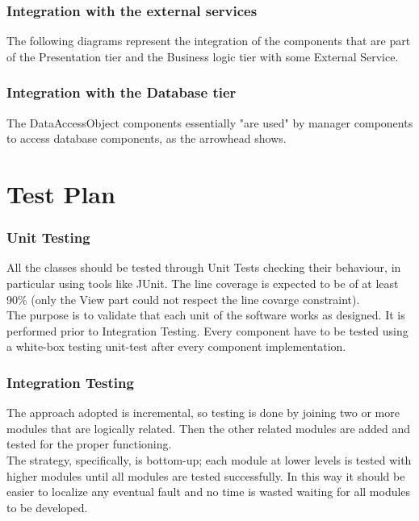 \documentclass[../DD.tex]{subfiles}
\begin{document}
\subsubsection{Integration with the external services}
The following diagrams represent the integration of the components that are part of the Presentation tier and the Business logic tier with some External Service.


\subsubsection{Integration with the Database tier}
The DataAccessObject components essentially "are used" by manager components to access database components, as the arrowhead shows.

\newpage

\section{Test Plan\label{5.4}}

\subsubsection{Unit Testing\label{5.4.1}}
All the classes should be tested through Unit Tests checking their behaviour, in particular using tools like JUnit. The line coverage is expected to be of at least 90\% (only the View part could not respect the line covarge constraint).\\

The purpose is to validate that each unit of the software works as designed. It is performed prior to Integration Testing. Every component have to be tested using a white-box testing unit-test after every component implementation.


\subsubsection{Integration Testing\label{5.4.2}}

The approach adopted is incremental, so testing is done by joining two or more modules that are logically related. Then the other related modules are added and tested for the proper functioning.\\

The strategy, specifically, is bottom-up; each module at lower levels is tested with higher modules until all modules are tested successfully. In this way it should be easier to localize any eventual fault and no time is wasted waiting for all modules to be developed.
\end{document}
